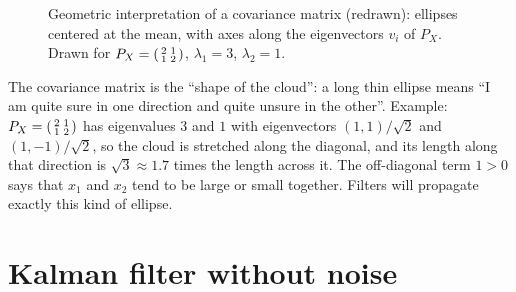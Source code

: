 \documentclass[11pt,a4paper]{article}
\def\boldsymbol#1{#1}%
\def\mathbf#1{#1}%
\newcommand{\mP}{\mathbf{P}}
\newcommand{\slides}[1]{\texorpdfstring{\hspace{0.5em}{\normalfont\small\emph{(#1)}}}{}}
\def\mx{3.3}
\def\my{2.6}
\theoremstyle{definition}
\theoremstyle{plain}
\theoremstyle{remark}
\begin{document}
\begin{figure}[H]
\centering
{}
\caption{Geometric interpretation of a covariance matrix (redrawn): ellipses centered at the mean, with axes along the
eigenvectors $\mathbf v_i$ of $\mP_X$. Drawn for $\mP_X=\begin{psmallmatrix}2&1\\1&2\end{psmallmatrix}$,
$\lambda_1=3$, $\lambda_2=1$.}\label{fig:gauss}
\end{figure}

\begin{intuition}
The covariance matrix is the ``shape of the cloud'': a long thin ellipse means ``I am quite sure in one direction and
quite unsure in the other''. Example: $\mP_X=\begin{psmallmatrix}2&1\\1&2\end{psmallmatrix}$ has
eigenvalues $3$ and $1$ with eigenvectors $(1,1)/\sqrt2$ and $(1,-1)/\sqrt2$, so the cloud is stretched along the diagonal, and
its length along that direction is $\sqrt3\approx1.7$ times the length across it. The off-diagonal term $1>0$
says that $x_1$ and $x_2$ tend to be large or small together. Filters will propagate exactly this kind of ellipse.
\end{intuition}

\section{Kalman filter without noise \slides{EKF deck, slides 5--9}}
\end{document}

